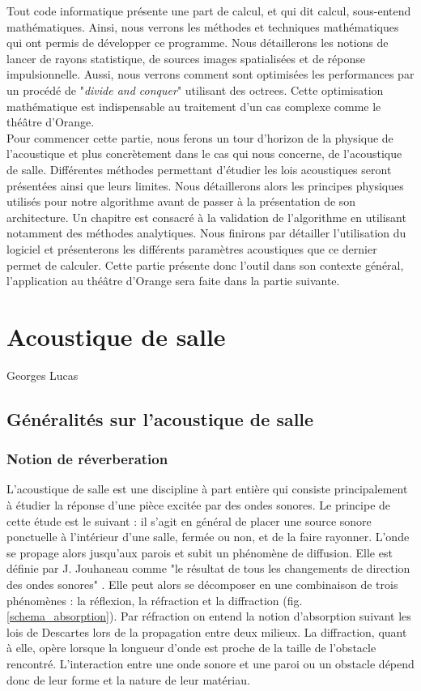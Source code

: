 Tout code informatique présente une part de calcul, et qui dit calcul, sous-entend mathématiques. Ainsi, nous verrons les méthodes et techniques mathématiques qui ont permis de développer ce programme. Nous détaillerons les notions de lancer de rayons statistique, de sources images spatialisées et de réponse impulsionnelle. Aussi, nous verrons comment sont optimisées les performances par un procédé de "\textit{divide and conquer}" utilisant des \glspl{octree}. Cette optimisation mathématique est indispensable au traitement d'un cas complexe comme le théâtre d'Orange. \\

Pour commencer cette partie, nous ferons un tour d'horizon de la physique de l'acoustique et plus concrètement dans le cas qui nous concerne, de l'acoustique de salle. Différentes méthodes permettant d'étudier les lois acoustiques seront présentées ainsi que leurs limites. Nous détaillerons alors les principes physiques utilisés pour notre algorithme avant de passer à la présentation de son architecture. Un chapitre est consacré à la validation de l'algorithme en utilisant notamment des méthodes analytiques. Nous finirons par détailler l'utilisation du logiciel et présenterons les différents paramètres acoustiques que ce dernier permet de calculer. Cette partie présente donc l'outil dans son con\-texte général, l'application au théâtre d'Orange sera faite dans la partie suivante.



\chapter{Acoustique de salle}
			{Georges Lucas}
		\minitoc
		\newpage
			
		
\section{Généralités sur l'acoustique de salle}
\subsection{Notion de réverberation}
L'acoustique de salle est une discipline à part entière qui consiste principalement à étudier la réponse d'une pièce excitée par des ondes sonores. Le principe de cette étude est le suivant : il s'agit en général de placer une source sonore ponctuelle à l'intérieur d'une salle, fermée ou non, et de la faire rayonner. L'onde se propage alors jusqu'aux parois et subit un phénomène de diffusion. Elle est définie par J. Jouhaneau comme "le résultat de tous les changements de direction des ondes sonores" \cite[p. 3]{jouhaneau}. Elle peut alors se décomposer en une combinaison de trois phénomènes : la réflexion, la réfraction et la diffraction (fig. \ref{schema_absorption}). Par réfraction on entend la notion d'absorption suivant les lois de Descartes lors de  la propagation entre deux milieux. La diffraction, quant à elle, opère lorsque la longueur d'onde est proche de la taille de l'obstacle rencontré. L'interaction entre une onde sonore et une paroi ou un obstacle dépend donc de leur forme et la nature de leur matériau.

